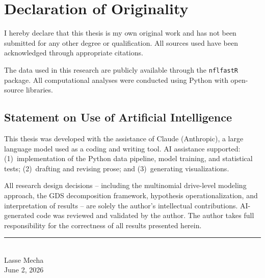 \chapter*{Declaration of Originality}

I hereby declare that this thesis is my own original work and has not been submitted for any other degree or qualification. All sources used have been acknowledged through appropriate citations.

The data used in this research are publicly available through the \texttt{nflfastR} package. All computational analyses were conducted using Python with open-source libraries.

\section*{Statement on Use of Artificial Intelligence}

This thesis was developed with the assistance of Claude (Anthropic), a large language model used as a coding and writing tool. AI assistance supported: (1)~implementation of the Python data pipeline, model training, and statistical tests; (2)~drafting and revising prose; and (3)~generating visualizations.

All research design decisions -- including the multinomial drive-level modeling approach, the GDS decomposition framework, hypothesis operationalization, and interpretation of results -- are solely the author's intellectual contributions. AI-generated code was reviewed and validated by the author. The author takes full responsibility for the correctness of all results presented herein.

\vspace{2cm}

\noindent\rule{6cm}{0.4pt}\\
\noindent Lasse Mecha\\
\noindent June 2, 2026
